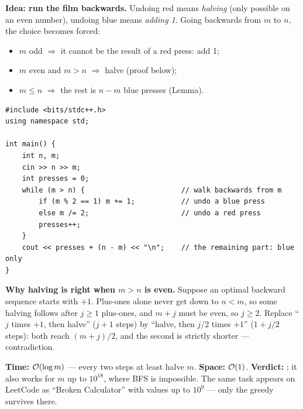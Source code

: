 \begin{alternativebox}
\textbf{Idea: run the film backwards.} Undoing red means \emph{halving} (only possible on an even number), undoing blue means \emph{adding 1}. Going backwards from $m$ to $n$, the choice becomes forced:
\begin{itemize}[leftmargin=*]
    \item $m$ odd $\Rightarrow$ it cannot be the result of a red press: add 1;
    \item $m$ even and $m > n$ $\Rightarrow$ halve (proof below);
    \item $m \le n$ $\Rightarrow$ the rest is $n - m$ blue presses (Lemma).
\end{itemize}
\begin{lstlisting}[style=cpp]
#include <bits/stdc++.h>
using namespace std;

int main() {
    int n, m;
    cin >> n >> m;
    int presses = 0;
    while (m > n) {                       // walk backwards from m
        if (m % 2 == 1) m += 1;           // undo a blue press
        else m /= 2;                      // undo a red press
        presses++;
    }
    cout << presses + (n - m) << "\n";    // the remaining part: blue only
}
\end{lstlisting}
\textbf{Why halving is right when $m > n$ is even.} Suppose an optimal backward sequence starts with $+1$. Plus-ones alone never get down to $n < m$, so some halving follows after $j \ge 1$ plus-ones, and $m + j$ must be even, so $j \ge 2$. Replace ``$j$ times $+1$, then halve'' ($j + 1$ steps) by ``halve, then $j/2$ times $+1$'' ($1 + j/2$ steps): both reach $(m + j)/2$, and the second is strictly shorter --- contradiction.

\begin{diagrambox}
\end{diagrambox}

\begin{complexitybox}
\textbf{Time:} $\mathcal{O}(\log m)$ --- every two steps at least halve $m$. \textbf{Space:} $\mathcal{O}(1)$. \textbf{Verdict:} \ac{}; it also works for $m$ up to $10^{18}$, where BFS is impossible. The same task appears on LeetCode as ``Broken Calculator'' with values up to $10^9$ --- only the greedy survives there.
\end{complexitybox}
\end{alternativebox}

